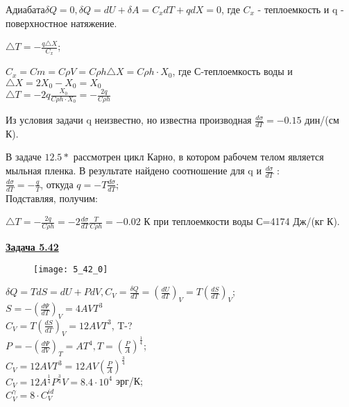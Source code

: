 \documentclass[12pt]{article}
\begin{document}
\vspace{0.5cm}

$Адиабата \delta Q=0, \delta Q=dU+\delta A=C_x dT+q dX=0$, где $C_x$ - теплоемкость и q - поверхностное натяжение.

$\triangle T=-\frac{q\triangle X}{C_x}$;

$C_x=Cm=C\rho V=C\rho h\triangle X=C\rho h\cdot X_0$, где С-теплоемкость воды и $\triangle X=2X_0-X_0=X_0$\\

$\triangle T=-2q\frac{X_0}{C\rho h\cdot X_0}=-\frac{2q}{C\rho h}$

Из условия задачи q неизвестно, но известна производная $\frac{d\sigma}{dT}=-0.15$ дин/(см К).

В задаче $12.5*$ рассмотрен цикл Карно, в котором рабочем телом является мыльная пленка. В результате найдено соотношение  для q и $\frac{d\sigma}{dT}$ :\\

$\frac{d\sigma}{dT}=-\frac{q}{T}$, откуда $q=-T\frac{d\sigma}{dT}$;\\ Подставляя, получим:

$\triangle T=-\frac{2q}{C\rho h}=-2\frac{d\sigma}{dT}\frac{T}{C\rho h}=-0.02$ К при теплоемкости воды С=4174 Дж/(кг К).


\newpage


{\underline\bf Задача 5.42}

\begin{figure}[h]
\texttt{[image: 5\_42\_0]}
\end{figure}

\vspace{0.5cm}

$\delta Q=TdS=dU+PdV, C_V=\frac{\delta Q}{dT}=\left(\frac{dU}{dT}\right)_V=T\left(\frac{dS}{dT}\right)_V$;\\

$S=-\left(\frac{d\Psi}{dT}\right)_V=4AVT^3$\\

$C_V=T\left(\frac{dS}{dT}\right)_V=12AVT^3$, T-?\\

$P=-\left(\frac{d\Psi}{dV}\right)_T=AT^4, T=\left(\frac{P}{A}\right)^{\frac{1}{4}}$;\\

$C_V=12AVT^3=12AV\left(\frac{P}{A}\right)^{\frac{3}{4}}$\\

$C_V=12A^{\frac{1}{4}}P^{\frac{3}{4}}V=8.4\cdot10^4$ эрг/К;\\

$C_V^{\gamma}=8\cdot C_V^{id}$
\end{document}
